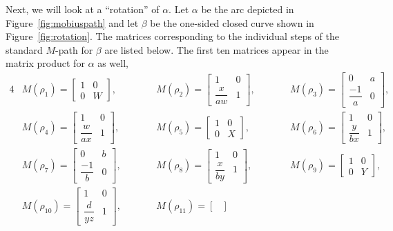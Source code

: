 \documentclass[pdftex]{sigma}
\numberwithin{equation}{section}
\theoremstyle{definition}
\begin{document}
Next, we will look at a ``rotation'' of $\alpha$. Let $\alpha$ be the arc depicted in Figure~\ref{fig:mobiuspath} and let $\beta$ be the one-sided closed curve shown in Figure~\ref{fig:rotation}. The matrices corresponding to the individual steps of the standard $M$-path for $\beta$ are listed below. The first ten matrices appear in the matrix product for $\alpha$ as well,
\begin{alignat*}{4}
&M( \rho_{1}) = \begin{bmatrix}
1 & 0\\
0 & W
\end{bmatrix} ,\qquad&&
 M( \rho _{2}) = \begin{bmatrix}
1 & 0\\
\dfrac{x}{aw} & 1
\end{bmatrix} ,\qquad&& M( \rho _{3}) = \begin{bmatrix}
0 & a\\
\dfrac{-1}{a} & 0
\end{bmatrix} ,&\\ &M( \rho _{4}) = \begin{bmatrix}
1 & 0\\
\dfrac{w}{ax} & 1
\end{bmatrix} ,\qquad&&
M( \rho _{5}) = \begin{bmatrix}
1 & 0\\
0 & X
\end{bmatrix} ,\qquad&& M( \rho _{6}) = \begin{bmatrix}
1 & 0\\
\dfrac{y}{bx} & 1
\end{bmatrix} ,&\\ &M( \rho _{7}) = \begin{bmatrix}
0 & b\\
\dfrac{-1}{b} & 0
\end{bmatrix} ,\qquad&& M( \rho _{8}) = \begin{bmatrix}
1 & 0\\
\dfrac{x}{by} & 1
\end{bmatrix} ,
\qquad&&
M( \rho _{9}) = \begin{bmatrix}
1 & 0\\
0 & Y
\end{bmatrix} ,&\\ &M( \rho _{10}) = \begin{bmatrix}
1 & 0\\
\dfrac{d}{yz} & 1
\end{bmatrix} ,\qquad&& M( \rho _{11}) = \begin{bmatrix}

\end{bmatrix}
\end{alignat*}
\end{document}
